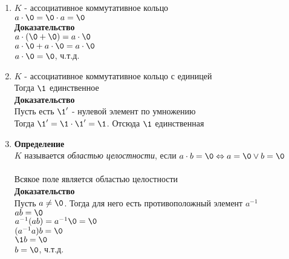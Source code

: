 \documentclass[12pt]{article}
\begin{document}
\begin{enumerate}
    \item $K$ - ассоциативное коммутативное кольцо\\
    $a\cdot\0=\0\cdot a=\0$\\
    \textbf{Доказательство}\\
    $a\cdot(\0+\0) = a\cdot\0$\\
    $a\cdot\0+a\cdot\0=a\cdot\0$\\
    $a\cdot\0 = \0$, ч.т.д.
    \item $K$ - ассоциативное коммутативное кольцо с единицей\\
    Тогда $\1$ единственное\\
    \textbf{Доказательство}\\
    Пусть есть $\1'$ - нулевой элемент по умножению\\
    Тогда $\1'=\1\cdot\1' = \1$. Отсюда $\1$ единственная
    \item \textbf{Определение}\\
    $K$ называется \textit{областью целостности}, если $a\cdot b = \0 \Leftrightarrow a=\0 \lor b=\0$\\\\
    Всякое поле является областью целостности\\
    \textbf{Доказательство}\\
    Пусть $a\neq \0$. Тогда для него есть противоположный элемент $a^{-1}$\\
    $ab=\0$\\
    $a^{-1}(ab)=a^{-1}\0=\0$\\
    $(a^{-1}a)b=\0$\\
    $\1b=\0$\\
    $b=\0$, ч.т.д.
\end{enumerate}
\end{document}
